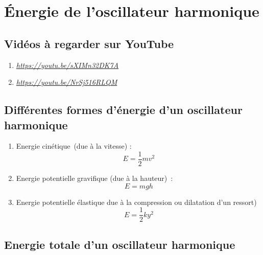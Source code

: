 \hypertarget{uxe9nergie-de-loscillateur-harmonique}{%
\section[Énergie de l'oscillateur
harmonique]{\texorpdfstring{\protect\hypertarget{anchor}{}{}Énergie de
l'oscillateur
harmonique}{Énergie de l'oscillateur harmonique}}\label{uxe9nergie-de-loscillateur-harmonique}}

\hypertarget{viduxe9os-uxe0-regarder-sur-youtube}{%
\subsection[Vidéos à regarder sur
YouTube]{\texorpdfstring{\protect\hypertarget{anchor-1}{}{}Vidéos à
regarder sur
YouTube}{Vidéos à regarder sur YouTube}}\label{viduxe9os-uxe0-regarder-sur-youtube}}

\begin{enumerate}
\def\labelenumi{\arabic{enumi}.}
\tightlist
\item
  \href{https://youtu.be/sXIMn32DK7A}{\emph{https://youtu.be/sXIMn32DK7A}}
\item
  \href{https://youtu.be/NrSj516RLQM}{\emph{https://youtu.be/NrSj516RLQM}}
\end{enumerate}

\hypertarget{diffuxe9rentes-formes-duxe9nergie-dun-oscillateur-harmonique}{%
\subsection[Différentes formes d'énergie d'un oscillateur
harmonique]{\texorpdfstring{\protect\hypertarget{anchor-2}{}{}Différentes
formes d'énergie d'un oscillateur
harmonique}{Différentes formes d'énergie d'un oscillateur harmonique}}\label{diffuxe9rentes-formes-duxe9nergie-dun-oscillateur-harmonique}}

\begin{enumerate}
\def\labelenumi{\arabic{enumi}.}
\tightlist
\item
  Energie cinétique~(due à la vitesse) : \[{E = \frac{1}{2}}mv^{2}\]
\item
  Energie potentielle gravifique (due à la hauteur)~:
  \[E = \mathit{mgh}\]
\item
  Energie potentielle élastique due à la compression ou dilatation d'un
  ressort)\[{E = \frac{1}{2}}ky^{2}\]
\end{enumerate}

\hypertarget{energie-totale-dun-oscillateur-harmonique}{%
\subsection[Energie totale d'un oscillateur
harmonique]{\texorpdfstring{\protect\hypertarget{anchor-3}{}{}Energie
totale d'un oscillateur
harmonique}{Energie totale d'un oscillateur harmonique}}\label{energie-totale-dun-oscillateur-harmonique}}

